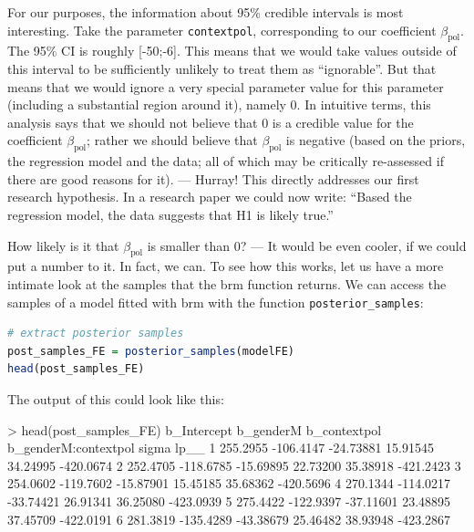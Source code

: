 \documentclass[nobib]{tufte-handout}
\begin{document}
For our purposes, the information about 95\% credible intervals is most interesting. Take the parameter \texttt{contextpol}, corresponding to our coefficient $\beta_{\text{pol}}$. The 95\% CI is roughly [-50;-6]. This means that we would take values outside of this interval to be sufficiently unlikely to treat them as ``ignorable''. But that means that we would ignore a very special parameter value for this parameter (including a substantial region around it), namely 0. In intuitive terms, this analysis says that we should not believe that 0 is a credible value for the coefficient $\beta_{\text{pol}}$; rather we should believe that $\beta_{\text{pol}}$ is negative (based on the priors, the regression model and the data; all of which may be critically re-assessed if there are good reasons for it). --- Hurray! This directly addresses our first research hypothesis. In a research paper we could now write: ``Based the regression model, the data suggests that H1 is likely true.''

How likely is it that $\beta_{\text{pol}}$ is smaller than 0? --- It would be even cooler, if we could put a number to it. In fact, we can. To see how this works, let us have a more intimate look at the samples that the \textrm{brm} function returns. We can access the samples of a model fitted with \textrm{brm} with the function \texttt{posterior\_samples}:

\begin{minipage}[]{\textwidth}
\begin{lstlisting}[language=R]
# extract posterior samples 
post_samples_FE = posterior_samples(modelFE)
head(post_samples_FE)
\end{lstlisting}
\end{minipage}

The output of this could look like this:

\medskip

\begin{minipage}[]{1.2\textwidth}
\begin{rc}
> head(post_samples_FE)
  b_Intercept b_genderM b_contextpol b_genderM:contextpol    sigma      lp__
1    255.2955 -106.4147    -24.73881             15.91545 34.24995 -420.0674
2    252.4705 -118.6785    -15.69895             22.73200 35.38918 -421.2423
3    254.0602 -119.7602    -15.87901             15.45185 35.68362 -420.5696
4    270.1344 -114.0217    -33.74421             26.91341 36.25080 -423.0939
5    275.4422 -122.9397    -37.11601             23.48895 37.45709 -422.0191
6    281.3819 -135.4289    -43.38679             25.46482 38.93948 -423.2867
\end{rc}
\end{minipage}
\end{document}
